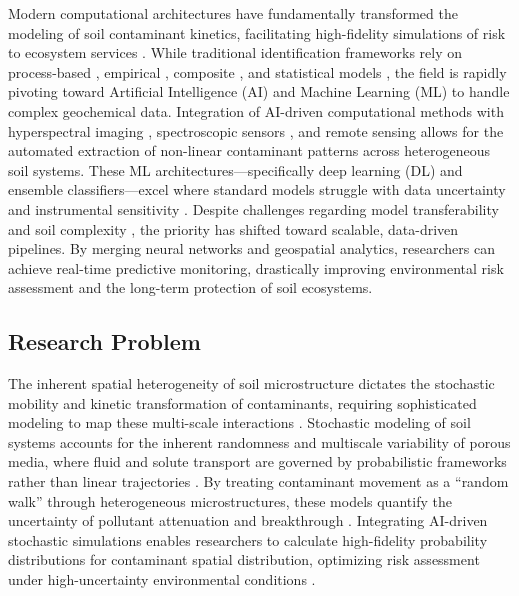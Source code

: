 \documentclass[sn-mathphys-num]{sn-jnl}
\begin{document}
Modern computational architectures have fundamentally transformed the
modeling of soil contaminant kinetics, facilitating high-fidelity simulations
of risk to ecosystem services \cite{Liu2020,Zhang2021,Proshad2025,Lemenkova2025d}.
While traditional identification frameworks rely on process-based
\cite{Giannakis2017,Karlen2019}, empirical \cite{Benavidez2018,Lal2020},
composite \cite{Sadhukhan2022}, and statistical models
\cite{Lu2020,Feng2024,Lemenkova2024b}, the field is rapidly pivoting toward
Artificial Intelligence (AI) and Machine Learning (ML) to handle complex
geochemical data. Integration of AI-driven computational methods
\cite{Proshad2025,Lemenkova2025d,Feng2024,Li2023} with hyperspectral imaging
\cite{Fan2025,Shi2021}, spectroscopic sensors \cite{Xu2026,Guo2025}, and
remote sensing \cite{Lemenkova2025b,Zhang2022} allows for the automated
extraction of non-linear contaminant patterns across heterogeneous soil
systems. These ML architectures---specifically deep learning (DL) and
ensemble classifiers---excel where standard models struggle with data
uncertainty \cite{Lu2020,Karlen2019,Li2023} and instrumental sensitivity
\cite{Rosskopfova2012}. Despite challenges regarding model transferability
\cite{Benavidez2018,Zhang2021} and soil complexity
\cite{Klaucol2017,Lemenkova2023b}, the priority has shifted toward scalable,
data-driven pipelines. By merging neural networks and geospatial analytics,
researchers can achieve real-time predictive monitoring, drastically improving
environmental risk assessment and the long-term protection of soil ecosystems.

\subsection{Research Problem}\label{sec1.2}

The inherent spatial heterogeneity of soil microstructure dictates the
stochastic mobility and kinetic transformation of contaminants, requiring
sophisticated modeling to map these multi-scale interactions \cite{Vogel2018}.
Stochastic modeling of soil systems accounts for the inherent randomness and
multiscale variability of porous media, where fluid and solute transport are
governed by probabilistic frameworks rather than linear trajectories
\cite{Vogel2018,Lemenkova2023}. By treating contaminant movement as a
``random walk'' through heterogeneous microstructures, these models quantify
the uncertainty of pollutant attenuation and breakthrough
\cite{Lu2020,Karlen2019}. Integrating AI-driven stochastic simulations enables
researchers to calculate high-fidelity probability distributions for
contaminant spatial distribution, optimizing risk assessment under
high-uncertainty environmental conditions \cite{Li2023,Feng2024}.
\end{document}
